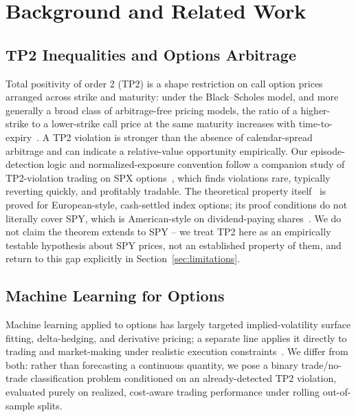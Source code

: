 \documentclass[sigconf,review]{acmart}
\begin{document}
\section{Background and Related Work}
\label{sec:related}

\subsection{TP2 Inequalities and Options Arbitrage}
Total positivity of order 2 (TP2) is a shape restriction on call option prices arranged across strike and maturity: under the Black--Scholes model, and more generally a broad class of arbitrage-free pricing models, the ratio of a higher-strike to a lower-strike call price at the same maturity increases with time-to-expiry~\cite{glasserman2026tp2theory,glasserman2023convexity}. A TP2 violation is stronger than the absence of calendar-spread arbitrage and can indicate a relative-value opportunity empirically. Our episode-detection logic and normalized-exposure convention follow a companion study of TP2-violation trading on SPX options~\cite{glasserman2025tp2}, which finds violations rare, typically reverting quickly, and profitably tradable. The theoretical property itself~\cite{glasserman2026tp2theory} is proved for European-style, cash-settled index options; its proof conditions do not literally cover SPY, which is American-style on dividend-paying shares~\cite{cosma2020earlyexercise}. We do not claim the theorem extends to SPY -- we treat TP2 here as an empirically testable hypothesis about SPY prices, not an established property of them, and return to this gap explicitly in Section~\ref{sec:limitations}.

\subsection{Machine Learning for Options}
Machine learning applied to options has largely targeted implied-volatility surface fitting, delta-hedging, and derivative pricing; a separate line applies it directly to trading and market-making under realistic execution constraints~\cite{kearns2013mlmicrostructure}. We differ from both: rather than forecasting a continuous quantity, we pose a binary trade/no-trade classification problem conditioned on an already-detected TP2 violation, evaluated purely on realized, cost-aware trading performance under rolling out-of-sample splits.
\end{document}
